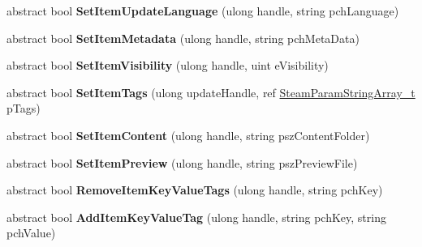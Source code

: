 \begin{DoxyCompactItemize}
abstract bool {\bfseries Set\+Item\+Update\+Language} (ulong handle, string pch\+Language)
\item 
\mbox{\label{class_valve_1_1_steamworks_1_1_i_steam_u_g_c_a695bcb1ea8d46c66c0a6fbc5d86fb598}} 
abstract bool {\bfseries Set\+Item\+Metadata} (ulong handle, string pch\+Meta\+Data)
\item 
\mbox{\label{class_valve_1_1_steamworks_1_1_i_steam_u_g_c_ac7d8de3bd2ba0b2a76de7f7aba42bae7}} 
abstract bool {\bfseries Set\+Item\+Visibility} (ulong handle, uint e\+Visibility)
\item 
\mbox{\label{class_valve_1_1_steamworks_1_1_i_steam_u_g_c_a6447178e7f023078842ed48d18755d9b}} 
abstract bool {\bfseries Set\+Item\+Tags} (ulong update\+Handle, ref \hyperlink{struct_valve_1_1_steamworks_1_1_steam_param_string_array__t}{Steam\+Param\+String\+Array\+\_\+t} p\+Tags)
\item 
\mbox{\label{class_valve_1_1_steamworks_1_1_i_steam_u_g_c_ab81805a14474b53a9e6aa6e36267ae83}} 
abstract bool {\bfseries Set\+Item\+Content} (ulong handle, string psz\+Content\+Folder)
\item 
\mbox{\label{class_valve_1_1_steamworks_1_1_i_steam_u_g_c_a1bdd6830092ec68053f454adcb251f39}} 
abstract bool {\bfseries Set\+Item\+Preview} (ulong handle, string psz\+Preview\+File)
\item 
\mbox{\label{class_valve_1_1_steamworks_1_1_i_steam_u_g_c_a6892ade790740f9279e6dc58d252b4fb}} 
abstract bool {\bfseries Remove\+Item\+Key\+Value\+Tags} (ulong handle, string pch\+Key)
\item 
\mbox{\label{class_valve_1_1_steamworks_1_1_i_steam_u_g_c_a703fd86004e60f37b12e5dd92c0918c1}} 
abstract bool {\bfseries Add\+Item\+Key\+Value\+Tag} (ulong handle, string pch\+Key, string pch\+Value)
\item 
\mbox{\label{class_valve_1_1_steamworks_1_1_i_steam_u_g_c_a593ceea7c72bd5e0bf73f59318260135}} 

\end{DoxyCompactItemize}
